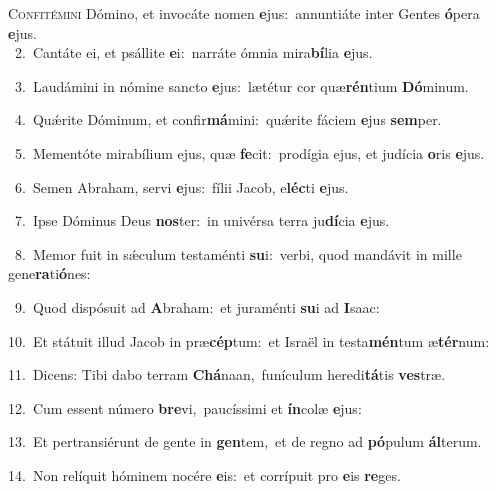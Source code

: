 \lettrine{\initial\textcolor{\initialcolor}{C}}{onfitémini} Dómino, et invocáte nomen \textbf{e}\-jus:~\star annuntiáte inter Gentes \textbf{ó}\-pera \textbf{e}\-jus.\\
{\numbfont\textcolor{\numbcolor}{~2.}}~Cantáte ei, et psállite \textbf{e}\-i:~\star narráte ómnia mira\-\textbf{bí}\-lia \textbf{e}\-jus.\par
{\numbfont\textcolor{\numbcolor}{~3.}}~Laudámini in nómine sancto \textbf{e}\-jus:~\star lætétur cor quæ\-\textbf{rén}\-tium \textbf{Dó}\-minum.\par
{\numbfont\textcolor{\numbcolor}{~4.}}~Quǽrite Dóminum, et confir\-\textbf{má}\-mini:~\star quǽrite fáciem \textbf{e}\-jus \textbf{sem}\-per.\par
{\numbfont\textcolor{\numbcolor}{~5.}}~Mementóte mirabílium ejus, quæ \textbf{fe}\-cit:~\star prodígia ejus, et judícia \textbf{o}\-ris \textbf{e}\-jus.\par
{\numbfont\textcolor{\numbcolor}{~6.}}~Semen Abraham, servi \textbf{e}\-jus:~\star fílii Jacob, e\-\textbf{léc}\-ti \textbf{e}\-jus.\par
{\numbfont\textcolor{\numbcolor}{~7.}}~Ipse Dóminus Deus \textbf{nos}\-ter:~\star in univérsa terra ju\-\textbf{dí}\-cia \textbf{e}\-jus.\par
{\numbfont\textcolor{\numbcolor}{~8.}}~Memor fuit in sǽculum testaménti \textbf{su}\-i:~\star verbi, quod mandávit in mille gene\-\textbf{ra}\-ti\-\textbf{ó}\-nes:\par
{\numbfont\textcolor{\numbcolor}{~9.}}~Quod dispósuit ad \textbf{A}\-braham:~\star et juraménti \textbf{su}\-i ad \textbf{I}\-saac:\par
{\numbfont\textcolor{\numbcolor}{10.}}~Et státuit illud Jacob in præ\-\textbf{cép}\-tum:~\star et Israël in testa\-\textbf{mén}\-tum æ\-\textbf{tér}\-num:\par
{\numbfont\textcolor{\numbcolor}{11.}}~Dicens: Tibi dabo terram \textbf{Chá}\-naan,~\star funículum heredi\-\textbf{tá}\-tis \textbf{ves}\-træ.\par
{\numbfont\textcolor{\numbcolor}{12.}}~Cum essent número \textbf{bre}\-vi,~\star paucíssimi et \textbf{ín}\-colæ \textbf{e}\-jus:\par
{\numbfont\textcolor{\numbcolor}{13.}}~Et pertransiérunt de gente in \textbf{gen}\-tem,~\star et de regno ad \textbf{pó}\-pulum \textbf{ál}\-terum.\par
{\numbfont\textcolor{\numbcolor}{14.}}~Non relíquit hóminem nocére \textbf{e}\-is:~\star et corrípuit pro \textbf{e}\-is \textbf{re}\-ges.\par
